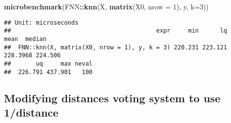 \documentclass[]{article}
\newenvironment{Shaded}{\begin{snugshade}}{\end{snugshade}}
\newcommand{\DataTypeTok}[1]{\textcolor[rgb]{0.13,0.29,0.53}{#1}}
\newcommand{\DecValTok}[1]{\textcolor[rgb]{0.00,0.00,0.81}{#1}}
\newcommand{\KeywordTok}[1]{\textcolor[rgb]{0.13,0.29,0.53}{\textbf{#1}}}
\newcommand{\NormalTok}[1]{#1}
\newcommand{\OperatorTok}[1]{\textcolor[rgb]{0.81,0.36,0.00}{\textbf{#1}}}
\begin{document}
\begin{Shaded}
\begin{Highlighting}[]
\KeywordTok{microbenchmark}\NormalTok{(FNN}\OperatorTok{::}\KeywordTok{knn}\NormalTok{(X, }\KeywordTok{matrix}\NormalTok{(X0, }\DataTypeTok{nrow =} \DecValTok{1}\NormalTok{), y, }\DataTypeTok{k=}\DecValTok{3}\NormalTok{))}
\end{Highlighting}
\end{Shaded}

\begin{verbatim}
## Unit: microseconds
##                                         expr     min      lq     mean  median
##  FNN::knn(X, matrix(X0, nrow = 1), y, k = 3) 220.231 223.121 228.3968 224.506
##       uq     max neval
##  226.791 437.901   100
\end{verbatim}

\newpage

\hypertarget{modifying-distances-voting-system-to-use-1distance}{%
\subsection{Modifying distances voting system to use
1/distance}\label{modifying-distances-voting-system-to-use-1distance}}
\end{document}
